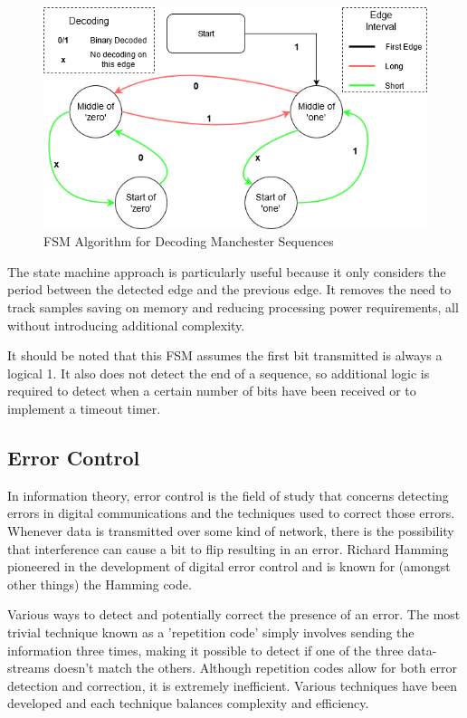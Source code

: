 \begin{figure}[H]
	\centering
	\includegraphics[width=0.7\linewidth]{figures/litreview/manchester_decoding_fsm.png}
	\caption{FSM Algorithm for Decoding Manchester Sequences}
	\label{fig:manchesterdecodingfsm}
\end{figure}

The state machine approach is particularly useful because it only considers the period between the detected edge and the previous edge. It removes the need to track samples saving on memory and reducing processing power requirements, all without introducing additional complexity.

It should be noted that this FSM assumes the first bit transmitted is always a logical 1. It also does not detect the end of a sequence, so additional logic is required to detect when a certain number of bits have been received or to implement a timeout timer.

\subsection{Error Control}

In information theory, error control is the field of study that concerns detecting errors in digital communications and the techniques used to correct those errors. Whenever data is transmitted over some kind of network, there is the possibility that interference can cause a bit to flip resulting in an error. Richard Hamming pioneered in the development of digital error control and is known for (amongst other things) the Hamming code.

Various ways to detect and potentially correct the presence of an error. The most trivial technique known as a 'repetition code' simply involves sending the information three times, making it possible to detect if one of the three data-streams doesn't match the others. Although repetition codes allow for both error detection and correction, it is extremely inefficient. Various techniques have been developed and each technique balances complexity and efficiency.

